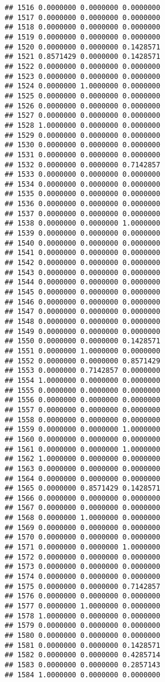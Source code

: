 \documentclass[
]{article}
\begin{document}
\begin{verbatim}
## 1516 0.0000000 0.0000000 0.0000000
## 1517 0.0000000 0.0000000 0.0000000
## 1518 0.0000000 0.0000000 0.0000000
## 1519 0.0000000 0.0000000 0.0000000
## 1520 0.0000000 0.0000000 0.1428571
## 1521 0.8571429 0.0000000 0.1428571
## 1522 0.0000000 0.0000000 0.0000000
## 1523 0.0000000 0.0000000 0.0000000
## 1524 0.0000000 1.0000000 0.0000000
## 1525 0.0000000 0.0000000 0.0000000
## 1526 0.0000000 0.0000000 0.0000000
## 1527 0.0000000 0.0000000 0.0000000
## 1528 1.0000000 0.0000000 0.0000000
## 1529 0.0000000 0.0000000 0.0000000
## 1530 0.0000000 0.0000000 0.0000000
## 1531 0.0000000 0.0000000 0.0000000
## 1532 0.0000000 0.0000000 0.7142857
## 1533 0.0000000 0.0000000 0.0000000
## 1534 0.0000000 0.0000000 0.0000000
## 1535 0.0000000 0.0000000 0.0000000
## 1536 0.0000000 0.0000000 0.0000000
## 1537 0.0000000 0.0000000 0.0000000
## 1538 0.0000000 0.0000000 1.0000000
## 1539 0.0000000 0.0000000 0.0000000
## 1540 0.0000000 0.0000000 0.0000000
## 1541 0.0000000 0.0000000 0.0000000
## 1542 0.0000000 0.0000000 0.0000000
## 1543 0.0000000 0.0000000 0.0000000
## 1544 0.0000000 0.0000000 0.0000000
## 1545 0.0000000 0.0000000 0.0000000
## 1546 0.0000000 0.0000000 0.0000000
## 1547 0.0000000 0.0000000 0.0000000
## 1548 0.0000000 0.0000000 0.0000000
## 1549 0.0000000 0.0000000 0.0000000
## 1550 0.0000000 0.0000000 0.1428571
## 1551 0.0000000 1.0000000 0.0000000
## 1552 0.0000000 0.0000000 0.8571429
## 1553 0.0000000 0.7142857 0.0000000
## 1554 1.0000000 0.0000000 0.0000000
## 1555 0.0000000 0.0000000 0.0000000
## 1556 0.0000000 0.0000000 0.0000000
## 1557 0.0000000 0.0000000 0.0000000
## 1558 0.0000000 0.0000000 0.0000000
## 1559 0.0000000 0.0000000 1.0000000
## 1560 0.0000000 0.0000000 0.0000000
## 1561 0.0000000 0.0000000 1.0000000
## 1562 1.0000000 0.0000000 0.0000000
## 1563 0.0000000 0.0000000 0.0000000
## 1564 0.0000000 0.0000000 0.0000000
## 1565 0.0000000 0.8571429 0.1428571
## 1566 0.0000000 0.0000000 0.0000000
## 1567 0.0000000 0.0000000 0.0000000
## 1568 0.0000000 1.0000000 0.0000000
## 1569 0.0000000 0.0000000 0.0000000
## 1570 0.0000000 0.0000000 0.0000000
## 1571 0.0000000 0.0000000 1.0000000
## 1572 0.0000000 0.0000000 0.0000000
## 1573 0.0000000 0.0000000 0.0000000
## 1574 0.0000000 0.0000000 0.0000000
## 1575 0.0000000 0.0000000 0.7142857
## 1576 0.0000000 0.0000000 0.0000000
## 1577 0.0000000 1.0000000 0.0000000
## 1578 1.0000000 0.0000000 0.0000000
## 1579 0.0000000 0.0000000 0.0000000
## 1580 0.0000000 0.0000000 0.0000000
## 1581 0.0000000 0.0000000 0.1428571
## 1582 0.0000000 0.0000000 0.4285714
## 1583 0.0000000 0.0000000 0.2857143
## 1584 1.0000000 0.0000000 0.0000000

\end{verbatim}
\end{document}
